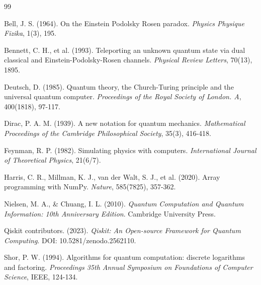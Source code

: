 \documentclass[11pt,a4paper,spanish]{book}
\begin{document}
\begin{thebibliography}{99}

Bell, J. S. (1964). On the Einstein Podolsky Rosen paradox. \emph{Physics Physique Fizika}, 1(3), 195. 

Bennett, C. H., et al. (1993). Teleporting an unknown quantum state via dual classical and Einstein-Podolsky-Rosen channels. \emph{Physical Review Letters}, 70(13), 1895.

Deutsch, D. (1985). Quantum theory, the Church-Turing principle and the universal quantum computer. \emph{Proceedings of the Royal Society of London. A}, 400(1818), 97-117.

Dirac, P. A. M. (1939). A new notation for quantum mechanics. \emph{Mathematical Proceedings of the Cambridge Philosophical Society}, 35(3), 416-418.

Feynman, R. P. (1982). Simulating physics with computers. \emph{International Journal of Theoretical Physics}, 21(6/7). 

Harris, C. R., Millman, K. J., van der Walt, S. J., et al. (2020). Array programming with NumPy. \emph{Nature}, 585(7825), 357-362.

Nielsen, M. A., \& Chuang, I. L. (2010). \emph{Quantum Computation and Quantum Information: 10th Anniversary Edition}. Cambridge University Press.

Qiskit contributors. (2023). \emph{Qiskit: An Open-source Framework for Quantum Computing}. DOI: 10.5281/zenodo.2562110.

Shor, P. W. (1994). Algorithms for quantum computation: discrete logarithms and factoring. \emph{Proceedings 35th Annual Symposium on Foundations of Computer Science}, IEEE, 124-134.

\end{thebibliography}
% 
%
\end{document}
